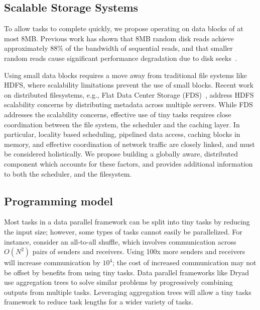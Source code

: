 \subsection{Scalable Storage Systems}
To allow tasks to complete quickly, we propose operating on data blocks of
at most $8$MB. Previous work has shown that $8$MB random disk reads achieve
approximately $88$\% of the bandwidth of sequential reads, and that smaller random
reads cause significant performance degradation due to disk
seeks~\cite{nightingale2012flat}. 

Using small data blocks requires a move away from traditional file systems like
HDFS, where scalability limitations prevent the use of small blocks.
Recent work on distributed filesystems, e.g., Flat Data Center
Storage (FDS)~\cite{nightingale2012flat}, address HDFS scalability concerns by
distributing metadata across multiple servers. While FDS addresses the scalability
concerns, effective use of tiny tasks requires close coordination between the file
system, the scheduler and the caching layer.
In particular, locality based scheduling, pipelined data access, caching blocks in 
memory, and effective coordination of network traffic are closely linked, and 
must be considered holistically. We propose building a globally aware, distributed
component which accounts for these factors, and provides additional information to
both the scheduler, and the filesystem.

\subsection{Programming model}
\label{sec:prog}
Most tasks in a data parallel framework can be split into tiny tasks by
reducing the input size; however, some types of tasks cannot easily be
parallelized.
For instance, consider an all-to-all shuffle, which involves
communication across $O(N^2)$ pairs of senders and receivers.
Using 100x more senders and receivers will increase communication by $10^4$;
the cost of increased communication may not be offset by benefits from
using tiny tasks.
Data parallel frameworks like Dryad~\cite{yu2008dryadlinq} use aggregation
trees to solve similar problems by progressively combining outputs from
multiple tasks. Leveraging aggregation trees will allow a tiny tasks framework
to reduce task lengths for a wider variety of tasks.


